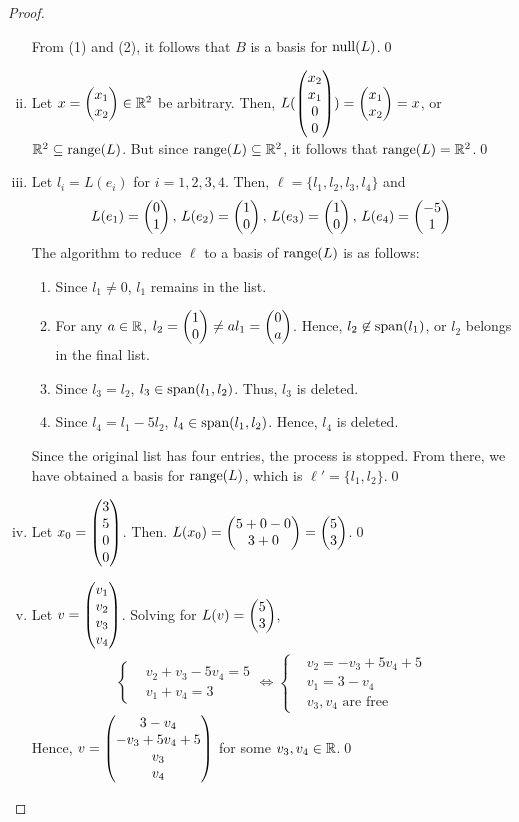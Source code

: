 \begin{proof}
\begin{enumerate}[(i)]
        From (1) and (2), it follows that $B$ is a basis for $\textnormal{null}(L)$.\qed
        \item Let $x=\begin{pmatrix} x_1\\ x_2\end{pmatrix}\in\mathbb R^2$ be arbitrary. Then, $L(\begin{pmatrix} x_2\\ x_1\\0 \\ 0\end{pmatrix})=\begin{pmatrix} x_1\\ x_2\end{pmatrix}=x$, or $\mathbb R^2\subseteq\textnormal{range}(L)$.
        But since $\textnormal{range}(L)\subseteq\mathbb R^2$, it follows that $\textnormal{range}(L)=\mathbb R^2$.\qed
        \item Let $l_i=L(e_i)$ for $i=1,2,3,4$.
        Then, $\ell=\{l_1,l_2,l_3,l_4\}$ and 
        \[
            \begin{aligned}
                L(e_1)=\begin{pmatrix} 0\\ 1\end{pmatrix},\,L(e_2)=\begin{pmatrix} 1\\ 0\end{pmatrix},\,L(e_3)=\begin{pmatrix} 1\\ 0\end{pmatrix},\,L(e_4)=\begin{pmatrix} -5\\ 1\end{pmatrix}
            \end{aligned}
        \]
        The algorithm to reduce $\ell$ to a basis of $\textnormal{range}(L)$ is as follows:
        \begin{enumerate}[Step (1):]
        \item Since $l_1\not=0$, $l_1$ remains in the list.
        \item For any $a\in\mathbb R$, $l_2=\begin{pmatrix} 1\\ 0\end{pmatrix}\not=al_1=\begin{pmatrix} 0\\ a\end{pmatrix}$. Hence, $l_2\not\in\textnormal{span}(l_1)$, or $l_2$ belongs in the final list.
        \item Since $l_3=l_2$, $l_3\in\textnormal{span}(l_1,l_2)$. Thus, $l_3$ is deleted.
        \item Since $l_4=l_1-5l_2$, $l_4\in\textnormal{span}(l_1,l_2)$. Hence, $l_4$ is deleted.
        \end{enumerate}
        Since the original list has four entries, the process is stopped. From there, we have obtained a basis for $\textnormal{range}(L)$, which is $\ell'=\{l_1,l_2\}$.\qed

        \item Let $x_0=\begin{pmatrix} 3\\ 5\\0 \\ 0\end{pmatrix}$. Then. $L(x_0)=\begin{pmatrix} 5+0-0\\ 3+0\end{pmatrix}=\begin{pmatrix} 5\\ 3\end{pmatrix}$.\qed
        \item Let $v=\begin{pmatrix} v_1\\ v_2\\v_3 \\ v_4\end{pmatrix}$. Solving for $L(v)=\begin{pmatrix} 5\\ 3\end{pmatrix}$, 
        \begin{align*}
            \begin{cases}
                &v_2+v_3-5v_4=5\\
                &v_1+v_4=3
            \end{cases}\iff
            \begin{cases}
                &v_2=-v_3+5v_4+5\\
                &v_1=3-v_4\\
                &v_3,v_4\text{ are free}
            \end{cases}
        \end{align*}
        Hence, $v=\begin{pmatrix} 3-v_4\\ -v_3+5v_4+5\\v_3 \\ v_4\end{pmatrix}$ for some $v_3,v_4\in\mathbb R$.\qed
    \end{enumerate}
    \renewcommand{\qedsymbol}{}
\end{proof}